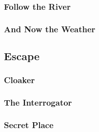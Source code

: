 \subsubsection{Follow the River}


\subsubsection{And Now the Weather}


\subsection{Escape}


\subsubsection{Cloaker}


\subsubsection{The Interrogator}


\subsubsection{Secret Place}

